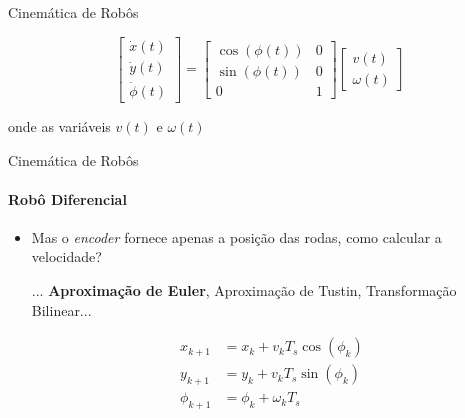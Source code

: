 \documentclass[aspectratio=169]{beamer}
\begin{document}
\begin{frame}{Cinemática de Robôs}
\begin{itemize}
              \begin{equation*}
                  \boxed{
                      \begin{bmatrix}
                          \dot{x}(t) \\
                          \dot{y}(t) \\
                          \dot{\phi}(t)
                      \end{bmatrix}
                      =
                      \begin{bmatrix}
                          \cos(\phi(t)) & 0 \\
                          \sin(\phi(t)) & 0 \\
                          0             & 1
                      \end{bmatrix}
                      \begin{bmatrix}
                          v(t) \\
                          \omega(t)
                      \end{bmatrix}}
              \end{equation*}

              onde as variáveis $v(t)$ e $\omega(t)$


    \end{itemize}
\end{frame}


\begin{frame}{Cinemática de Robôs}
    \framesubtitle{Robô Diferencial}
    \begin{itemize}
        \item Mas o \textit{encoder} fornece apenas a posição das rodas, como calcular a velocidade?

              ... \textbf{Aproximação de Euler}, Aproximação de Tustin, Transformação Bilinear...

              \begin{equation*}
                  \begin{split}
                      x_{k+1} &= x_k + v_k T_s\cos(\phi_k) \\
                      y_{k+1} &= y_k + v_k T_s\sin(\phi_k) \\
                      \phi_{k+1} &= \phi_k + \omega_k T_s \\
                  \end{split}
              \end{equation*}
    \end{itemize}
\end{frame}
\end{document}
